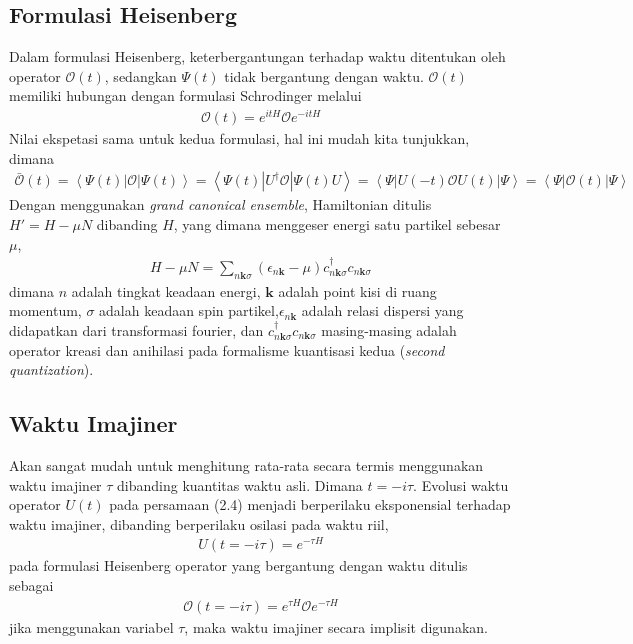 \subsection{Formulasi Heisenberg}
Dalam formulasi Heisenberg, keterbergantungan terhadap waktu ditentukan oleh operator $\mathcal{O}(t)$, sedangkan $\Psi(t)$ tidak bergantung dengan waktu. $\mathcal{O}(t)$ memiliki hubungan dengan formulasi Schrodinger melalui
\begin{align}
\mathcal{O}(t) = e^{itH} \mathcal{O} e^{-itH}
\end{align}
Nilai ekspetasi sama untuk kedua formulasi, hal ini mudah kita tunjukkan, dimana
\begin{align}
\bar{\mathcal{O}}(t) = \left\langle \Psi(t) | \mathcal{O} | \Psi(t) \right\rangle = \left\langle \Psi(t) | U^\dagger \mathcal{O} | \Psi(t) U \right\rangle = \left\langle \Psi | U(-t) \mathcal{O} U(t) | \Psi \right\rangle = \left\langle \Psi | \mathcal{O}(t) | \Psi \right\rangle
\end{align}
Dengan menggunakan \textit{grand canonical ensemble}, Hamiltonian ditulis $H' = H - \mu N$ dibanding $H$, yang dimana menggeser energi satu partikel sebesar $\mu$,
\begin{align}
H - \mu N = \sum_{n\mathbf{k}\sigma} (\epsilon_{n\mathbf{k}} - \mu ) c^\dagger_{n\mathbf{k}\sigma}c_{n\mathbf{k}\sigma}
\end{align}
dimana $n$ adalah tingkat keadaan energi, $\mathbf{k}$ adalah point kisi di ruang momentum, $\sigma$ adalah keadaan spin partikel,$\epsilon_{n\mathbf{k}}$ adalah relasi dispersi yang didapatkan dari transformasi fourier, dan $c^\dagger_{n\mathbf{k}\sigma}c_{n\mathbf{k}\sigma}$ masing-masing adalah operator kreasi dan anihilasi pada formalisme kuantisasi kedua (\textit{second quantization}).

\subsection{Waktu Imajiner}
Akan sangat mudah untuk menghitung rata-rata secara termis menggunakan waktu imajiner $\tau$ dibanding kuantitas waktu asli. Dimana $t = -i\tau$. Evolusi waktu operator $U(t)$ pada persamaan (2.4) menjadi berperilaku eksponensial terhadap waktu imajiner, dibanding berperilaku osilasi pada waktu riil,
\begin{align}
U(t = -i\tau) = e^{-\tau H}
\end{align}
pada formulasi Heisenberg operator yang bergantung dengan waktu ditulis sebagai
\begin{align}
\mathcal{O}(t = -i\tau) = e^{\tau H} \mathcal{O} e^{-\tau H}
\end{align}
jika menggunakan variabel $\tau$, maka waktu imajiner secara implisit digunakan.

